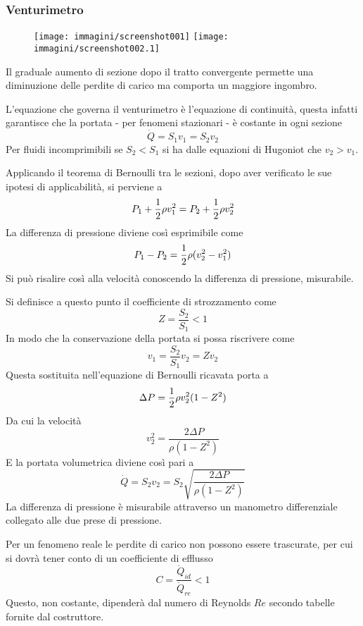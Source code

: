 \documentclass[a4paper, 15pt]{article}
\begin{document}
\subsubsection{Venturimetro}
\begin{adjustwidth}{2in}{}	
	\begin{figure}[H]
		\centering
		\texttt{[image: immagini/screenshot001]}
		\texttt{[image: immagini/screenshot002.1]}
		\label{fig:screenshot001}
	\end{figure}
	Il graduale aumento di sezione dopo il tratto convergente permette una diminuzione delle perdite di carico ma comporta un maggiore ingombro. \newline 
	
	L'equazione che governa il venturimetro è l'equazione di continuità, questa infatti garantisce che la portata - per fenomeni stazionari - è costante in ogni sezione
	\[\dot{Q} = S_1v_1 = S_2v_2\]
	Per fluidi incomprimibili se $S_2<S_1$ si ha dalle equazioni di Hugoniot che $v_2>v_1$. 
	
	Applicando il teorema di Bernoulli tra le sezioni, dopo aver verificato le sue ipotesi di applicabilità, si perviene a 
	\[P_1 + {1\over2}\rho v_1^2 = P_2 + {1\over2}\rho v_2^2\]
	La differenza di pressione diviene così esprimibile come 
	\[P_1-P_2 = {1\over2}\rho(v_2^2-v_1^2)\]
	Si può risalire così alla velocità conoscendo la differenza di pressione, misurabile. 
	
	Si definisce a questo punto il coefficiente di strozzamento come 
	\[Z = \dfrac{S_2}{S_1}<1\]
	In modo che la conservazione della portata si possa riscrivere come 
	\[v_1 = \dfrac{S_2}{S_1}v_2 = Zv_2\]
	Questa sostituita nell'equazione di Bernoulli ricavata porta a 
	\[\Delta P = {1\over2}\rho v_2^2(1-Z^2)\]
	Da cui la velocità 
	\[v_2^2 = \dfrac{2\Delta P}{\rho(1-Z^2)}\]
	E la portata volumetrica diviene così pari a 
	\[\dot{Q} = S_2v_2 = S_2\sqrt{\dfrac{2\Delta P}{\rho(1-Z^2)}}\]
	La differenza di pressione è misurabile attraverso un manometro differenziale collegato alle due prese di pressione. \newline 
	
	Per un fenomeno reale le perdite di carico non possono essere trascurate, per cui si dovrà tener conto di un coefficiente di efflusso
	\[C = \dfrac{\dot{Q}_{id}}{\dot{Q}_{re}}<1\]
	Questo, non costante, dipenderà dal numero di Reynolds $Re$ secondo tabelle fornite dal costruttore. \newline 
	

\end{adjustwidth}
\end{document}
